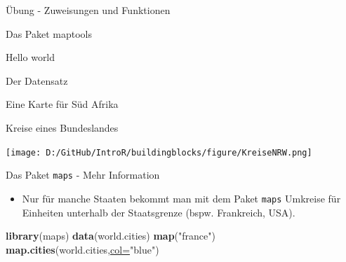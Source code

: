 \documentclass[ignorenonframetext,]{beamer}
\newenvironment{Shaded}{\begin{snugshade}}{\end{snugshade}}
\newcommand{\DataTypeTok}[1]{\textcolor[rgb]{0.74,0.68,0.62}{\underline{#1}}}
\newcommand{\DecValTok}[1]{\textcolor[rgb]{0.27,0.67,0.26}{#1}}
\newcommand{\KeywordTok}[1]{\textcolor[rgb]{0.26,0.66,0.93}{\textbf{#1}}}
\newcommand{\NormalTok}[1]{\textcolor[rgb]{0.74,0.68,0.62}{#1}}
\newcommand{\OperatorTok}[1]{\textcolor[rgb]{0.74,0.68,0.62}{#1}}
\newcommand{\StringTok}[1]{\textcolor[rgb]{0.02,0.61,0.04}{#1}}
\providecommand{\tightlist}{%
  \setlength{\itemsep}{0pt}\setlength{\parskip}{0pt}}
\begin{document}
\begin{frame}[fragile]{Übung - Zuweisungen und Funktionen}
\begin{frame}[fragile]{Das Paket maptools}
\begin{frame}[fragile]{Hello world}
\begin{frame}[fragile]{Der Datensatz}
\begin{frame}[fragile]{Eine Karte für Süd Afrika}
\begin{frame}[fragile]{Kreise eines Bundeslandes}
\protect\hypertarget{kreise-eines-bundeslandes}{}

\begin{Shaded}
\end{Shaded}

\texttt{[image: D:/GitHub/IntroR/buildingblocks/figure/KreiseNRW.png]}

\end{frame}

\begin{frame}[fragile]{Das Paket \texttt{maps} - Mehr Information}
\protect\hypertarget{das-paket-maps---mehr-information}{}

\begin{itemize}
\tightlist
\item
  Nur für manche Staaten bekommt man mit dem Paket \texttt{maps}
  Umkreise für Einheiten unterhalb der Staatsgrenze (bspw. Frankreich,
  USA).
\end{itemize}

\begin{Shaded}
\begin{Highlighting}[]
\KeywordTok{library}\NormalTok{(maps)}
\KeywordTok{data}\NormalTok{(world.cities)}
\KeywordTok{map}\NormalTok{(}\StringTok{"france"}\NormalTok{)}
\KeywordTok{map.cities}\NormalTok{(world.cities,}\DataTypeTok{col=}\StringTok{"blue"}\NormalTok{)}
\end{Highlighting}
\end{Shaded}


\end{frame}
\end{frame}
\end{frame}
\end{frame}
\end{frame}
\end{frame}
\end{document}
